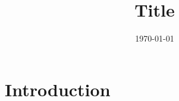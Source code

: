 \documentclass[a4paper]{article}
\title{Title}
\author{ }
\date{\today}
\theoremstyle{definition}
\theoremstyle{plain}
\begin{document}
\maketitle


\begin{abstract}
\end{abstract}

\section{Introduction}


\end{document}
